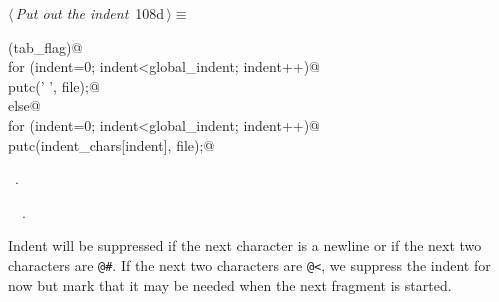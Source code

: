 \documentclass[a4paper]{report}
\begin{document}
\begin{flushleft} \small
\begin{minipage}{\linewidth}\label{scrap228}\raggedright\small
{} $\langle\,${\it Put out the indent}\nobreak\ {\footnotesize {108d}}$\,\rangle\equiv$
\vspace{-1ex}
\begin{list}{}{} \item
\mbox{}\verb@if (tab_flag)@\\
\mbox{}\verb@    for (indent=0; indent<global_indent; indent++)@\\
\mbox{}\verb@      putc(' ', file);@\\
\mbox{}\verb@  else@\\
\mbox{}\verb@    for (indent=0; indent<global_indent; indent++)@\\
\mbox{}\verb@      putc(indent_chars[indent], file);@\\
\mbox{}\verb@@{\NWsep}
\end{list}
\vspace{-1.5ex}
\footnotesize
\begin{list}{}{\setlength{\itemsep}{-\parsep}\setlength{\itemindent}{-\leftmargin}}
\item \NWtxtMacroRefIn\ .
\item \NWtxtIdentsUsed\nobreak\  \verb@putc@\nobreak\ .
\item{}
\end{list}
\end{minipage}\vspace{4ex}
\end{flushleft}
Indent will be suppressed if the next character is a newline or
if the next two characters are \verb|@#|. If the next two characters
are \verb|@<|, we suppress the indent for now but mark that it
may be needed when the next fragment is started.
\end{document}
